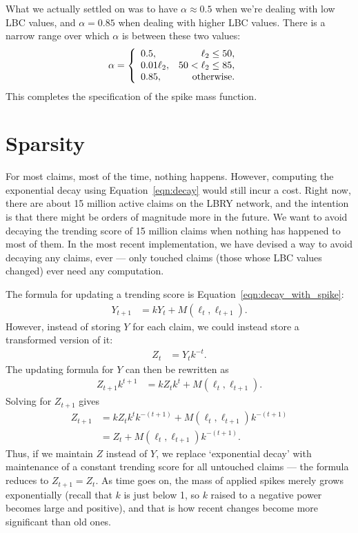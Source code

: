\documentclass[a4paper, 12pt]{article}
\begin{document}
What we actually settled on was to have $\alpha \approx 0.5$ when we're dealing
with low LBC values, and $\alpha = 0.85$ when dealing with higher LBC values.
There is a narrow range over which $\alpha$ is between these two values:
\begin{align}
\alpha &= \left\{
        \begin{array}{lr}
            0.5, & \ell_2 \leq 50,\\
            0.01\ell_2, & 50 < \ell_2 \leq 85,\\
            0.85, & \textnormal{otherwise}.
        \end{array}
        \right.
\end{align}
This completes the specification of the spike mass function.



\section{Sparsity}
For most claims, most of the time, nothing happens. However, computing the
exponential decay using Equation~\ref{eqn:decay} would still incur a cost.
Right now, there are about 15 million active claims on the LBRY network,
and the intention is that there might be orders of magnitude more in the
future. We want to avoid decaying the trending score of 15 million claims
when nothing has happened to most of them. In the most recent implementation,
we have devised a way to avoid decaying any claims, ever --- only touched claims
(those whose LBC values changed) ever need any computation.

The formula for updating a trending score is Equation~\ref{eqn:decay_with_spike}:
\begin{align}
Y_{t+1} &= kY_t + M(\ell_t, \ell_{t+1}).
\end{align}
However, instead of storing $Y$ for each claim, we could instead store
a transformed version of it:
\begin{align}
Z_t &= Y_t k^{-t}.
\end{align}
The updating formula for $Y$ can then be rewritten as
\begin{align}
Z_{t+1} k^{t+1} &= kZ_t k^t + M(\ell_t, \ell_{t+1}).
\end{align}
Solving for $Z_{t+1}$ gives
\begin{align}
Z_{t+1} &= kZ_t k^t k^{-(t+1)} + M(\ell_t, \ell_{t+1})k^{-(t+1)} \\
        &= Z_t + M(\ell_t, \ell_{t+1})k^{-(t+1)}. \label{eqn:sparse_update}
\end{align}
Thus, if we maintain $Z$ instead of $Y$, 
we replace `exponential decay' with maintenance of a constant trending
score for all untouched claims --- the formula reduces to $Z_{t+1}=Z_t$.
As time goes on, the mass of applied spikes
merely grows exponentially (recall that $k$ is just below 1, so $k$
raised to a negative power becomes large and positive),
and that is how recent changes become more significant than old ones.
\end{document}
